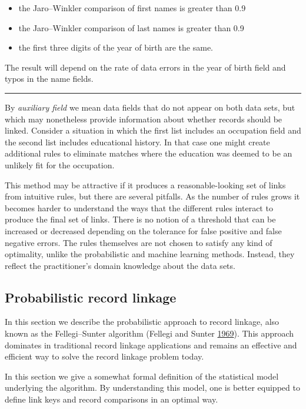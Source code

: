 \documentclass[]{krantz}
\begin{document}
\begin{itemize}
\item
  the Jaro--Winkler comparison of first names is greater than 0.9
\item
  the Jaro--Winkler comparison of last names is greater than 0.9
\item
  the first three digits of the year of birth are the same.
\end{itemize}

The result will depend on the rate of data errors in the year of birth
field and typos in the name fields.

\begin{center}\rule{0.5\linewidth}{\linethickness}\end{center}

By \emph{auxiliary field} we mean data fields that do not appear on both
data sets, but which may nonetheless provide information about whether
records should be linked. Consider a situation in which the first list
includes an occupation field and the second list includes educational
history. In that case one might create additional rules to eliminate
matches where the education was deemed to be an unlikely fit for the
occupation.

This method may be attractive if it produces a reasonable-looking set of
links from intuitive rules, but there are several pitfalls. As the
number of rules grows it becomes harder to understand the ways that the
different rules interact to produce the final set of links. There is no
notion of a threshold that can be increased or decreased depending on
the tolerance for false positive and false negative errors. The rules
themselves are not chosen to satisfy any kind of optimality, unlike the
probabilistic and machine learning methods. Instead, they reflect the
practitioner's domain knowledge about the data sets.

\subsection{Probabilistic record
linkage}\label{probabilistic-record-linkage}

In this section we describe the probabilistic approach to record
linkage, also known as the Fellegi--Sunter algorithm (Fellegi and Sunter
\protect\hyperlink{ref-FS69}{1969}). This approach dominates in
traditional record linkage applications and remains an effective and
efficient way to solve the record linkage problem today.

In this section we give a somewhat formal definition of the statistical
model underlying the algorithm. By understanding this model, one is
better equipped to define link keys and record comparisons in an optimal
way.
\end{document}
